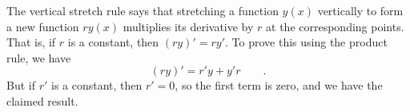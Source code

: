 The vertical stretch rule says that
stretching a function $y(x)$ vertically to form a new function $ry(x)$ multiplies its
                   derivative by $r$ at the corresponding points.
That is, if $r$ is a constant, then $(ry)'=ry'$. To prove this using the product
rule, we have
\begin{equation*}
  (ry)' = r'y+y'r \qquad .
\end{equation*}
But if $r'$ is a constant, then $r'=0$, so the first term is zero, and we have the
claimed result.
